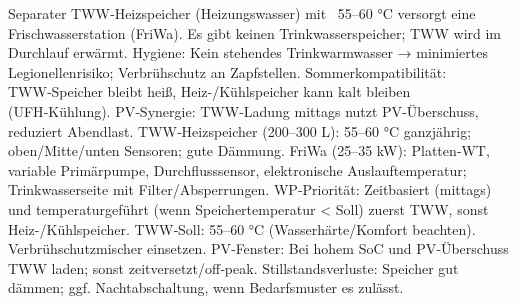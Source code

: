 \markdownRendererDocumentBegin
\markdownRendererSectionBegin
{}\markdownRendererInterblockSeparator
{}Separater TWW‑Heizspeicher (Heizungswasser) mit ~55–60 °C versorgt eine Frischwasserstation (FriWa). Es gibt keinen Trinkwasserspeicher; TWW wird im Durchlauf erwärmt.\markdownRendererInterblockSeparator
{}\markdownRendererSectionBegin
{}\markdownRendererInterblockSeparator
{}\markdownRendererUlBeginTight
\markdownRendererUlItem Hygiene: Kein stehendes Trinkwarmwasser → minimiertes Legionellenrisiko; Verbrühschutz an Zapfstellen.\markdownRendererUlItemEnd 
\markdownRendererUlItem Sommerkompatibilität: TWW‑Speicher bleibt heiß, Heiz-/Kühlspeicher kann kalt bleiben (UFH‑Kühlung).\markdownRendererUlItemEnd 
\markdownRendererUlItem PV‑Synergie: TWW‑Ladung mittags nutzt PV‑Überschuss, reduziert Abendlast.\markdownRendererUlItemEnd 
\markdownRendererUlEndTight \markdownRendererInterblockSeparator
{}
\markdownRendererSectionEnd \markdownRendererSectionBegin
{}\markdownRendererInterblockSeparator
{}\markdownRendererUlBeginTight
\markdownRendererUlItem TWW‑Heizspeicher (200–300 L): 55–60 °C ganzjährig; oben/Mitte/unten Sensoren; gute Dämmung.\markdownRendererUlItemEnd 
\markdownRendererUlItem FriWa (25–35 kW): Platten‑WT, variable Primärpumpe, Durchflusssensor, elektronische Auslauftemperatur; Trinkwasserseite mit Filter/Absperrungen.\markdownRendererUlItemEnd 
\markdownRendererUlItem WP‑Priorität: Zeitbasiert (mittags) und temperaturgeführt (wenn Speichertemperatur < Soll) zuerst TWW, sonst Heiz-/Kühlspeicher.\markdownRendererUlItemEnd 
\markdownRendererUlEndTight \markdownRendererInterblockSeparator
{}
\markdownRendererSectionEnd \markdownRendererSectionBegin
{}\markdownRendererInterblockSeparator
{}\markdownRendererUlBeginTight
\markdownRendererUlItem TWW‑Soll: 55–60 °C (Wasserhärte/Komfort beachten). Verbrühschutzmischer einsetzen.\markdownRendererUlItemEnd 
\markdownRendererUlItem PV‑Fenster: Bei hohem SoC und PV‑Überschuss TWW laden; sonst zeitversetzt/off‑peak.\markdownRendererUlItemEnd 
\markdownRendererUlItem Stillstandsverluste: Speicher gut dämmen; ggf. Nachtabschaltung, wenn Bedarfsmuster es zulässt.\markdownRendererUlItemEnd 
\markdownRendererUlEndTight \markdownRendererInterblockSeparator
{}
\markdownRendererSectionEnd \markdownRendererSectionBegin
{}\markdownRendererInterblockSeparator
{}\markdownRendererUlBeginTight
